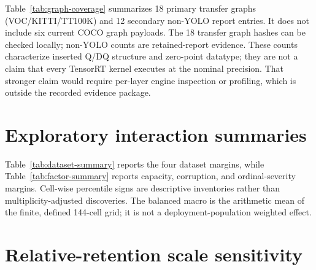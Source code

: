 \documentclass[10pt]{article}
\newcommand{\DeltaPsi}{\Delta\Psi}
\begin{document}
Table~\ref{tab:graph-coverage} summarizes 18 primary transfer graphs (VOC/KITTI/TT100K) and 12 secondary non-YOLO report entries. It does not include six current COCO graph payloads. The 18 transfer graph hashes can be checked locally; non-YOLO counts are retained-report evidence. These
counts characterize inserted Q/DQ structure and zero-point datatype; they are
not a claim that every TensorRT kernel executes at the nominal precision. That
stronger claim would require per-layer engine inspection or profiling, which is
outside the recorded evidence package.

\begin{table}[htbp]
\centering
\caption{Graph-level Q/DQ coverage for three transfer datasets, excluding COCO.
Ranges reflect the three dataset-specific graphs for each row.}
\label{tab:graph-coverage}
\scriptsize
\resizebox{\textwidth}{!}{}
\end{table}

\FloatBarrier

\section{Exploratory interaction summaries}

Table~\ref{tab:dataset-summary} reports the four dataset margins, while
Table~\ref{tab:factor-summary} reports capacity, corruption, and ordinal-severity
margins. Cell-wise percentile signs are descriptive inventories rather than
multiplicity-adjusted discoveries. The balanced macro is the arithmetic mean of
the finite, defined 144-cell grid; it is not a deployment-population
weighted effect.

\begin{table}[htbp]
\centering
\caption{Dataset-level direct interaction summaries. TT100K's $\DeltaPsi$ uses
the height endpoint; the other rows use the area endpoint.}
\label{tab:dataset-summary}
\small
\resizebox{0.88\textwidth}{!}{}
\end{table}

\begin{table}[htbp]
\centering
\caption{Factor-level heterogeneity in the exploratory direct ledger.}
\label{tab:factor-summary}
\scriptsize
\resizebox{\textwidth}{!}{}
\end{table}

\FloatBarrier

\section{Relative-retention scale sensitivity}
\end{document}
